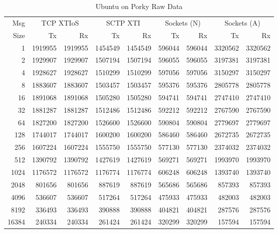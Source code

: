 \documentclass[letterpaper,final,notitlepage,twocolumn,10pt,twoside]{article}
\begin{document}
\begin{appendix}
\begin{table}[hbp]
\footnotesize
\begin{center}
\setlength{\tabcolsep}{0.2em}
\setlength{\arraycolsep}{0.2em}
\begin{tabular}{rrrrrrrrr}\\
Msg & \multicolumn{2}{c}{TCP XTIoS} & \multicolumn{2}{c}{SCTP XTI} & \multicolumn{2}{c}{Sockets (N)} & \multicolumn{2}{c}{Sockets (A)}\\
Size & Tx & Rx & Tx & Rx & Tx & Rx & Tx & Rx\\
\hline
\hline
1 & 1919955 & 1919955 & 1454549 & 1454549 & 596044 & 596044 & 3320562 & 3320562\\
2 & 1929907 & 1929907 & 1507194 & 1507194 & 596055 & 596055 & 3197381 & 3197381\\
4 & 1928627 & 1928627 & 1510299 & 1510299 & 597056 & 597056 & 3150297 & 3150297\\
8 & 1883607 & 1883607 & 1503457 & 1503457 & 595376 & 595376 & 2805778 & 2805778\\
16 & 1891068 & 1891068 & 1505280 & 1505280 & 594741 & 594741 & 2747410 & 2747410\\
32 & 1881287 & 1881287 & 1512486 & 1512486 & 592212 & 592212 & 2767590 & 2767590\\
64 & 1827200 & 1827200 & 1526600 & 1526600 & 590804 & 590804 & 2779697 & 2779697\\
128 & 1744017 & 1744017 & 1600200 & 1600200 & 586460 & 586460 & 2672735 & 2672735\\
256 & 1607224 & 1607224 & 1555750 & 1555750 & 577130 & 577130 & 2374032 & 2374032\\
512 & 1390792 & 1390792 & 1427619 & 1427619 & 569271 & 569271 & 1993970 & 1993970\\
1024 & 1176572 & 1176572 & 1176774 & 1176774 & 606248 & 606248 & 1393740 & 1393740\\
2048 & 801656 & 801656 & 887619 & 887619 & 565686 & 565686 & 857393 & 857393\\
4096 & 536607 & 536607 & 517264 & 517264 & 475933 & 475933 & 482003 & 482003\\
8192 & 336493 & 336493 & 390888 & 390888 & 404821 & 404821 & 287576 & 287576\\
16384 & 240334 & 240334 & 261424 & 261424 & 320299 & 320299 & 157594 & 157594\\
\hline
\end{tabular}
\end{center}
\normalsize
\caption[Ubuntu on Porky Raw Data]{Ubuntu on Porky Raw Data}
\label{table:u704data}
\end{table}


\end{appendix}
\end{document}
